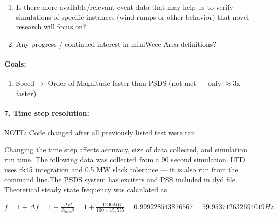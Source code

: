 \documentclass[12pt]{article}
\begin{document}
\begin{multicols}{2}
\begin{enumerate}
		\item Is there more available/relevant event data that may help us to verify simulations of specific instances (wind ramps or other behavior) that novel research will focus on? %

		\item  Any progress / continued interest in miniWecc Area definitions?

		
		
	\end{enumerate}
\paragraph{Goals:}
	\begin{enumerate}
	\item Speed$\longrightarrow$ Order of Magnitude faster than PSDS (not met --- only $\approx$3x faster)
	\end{enumerate}

\vfill\null

\end{multicols}
\pagebreak
\paragraph{7. Time step resolution:} NOTE: Code changed after all previously listed test were ran.

Changing the time step affects accuracy, size of data collected, and simulation run time. The following data was collected from a 90 second simulation. LTD uses rk45 integration and 0.5 MW slack tolerance --- it is also run from the command line.The PSDS system has exciters and PSS included in dyd file.
Theoretical steady state frequency was calculated as 

$f = 1+\Delta f = 1 + \frac{\Delta P}{S_{base}\beta} = 1 + \frac{-1200 MW}{100 \times 15,555} = 0.999228543876567 = 59.953712632594019 Hz  $
\end{document}
